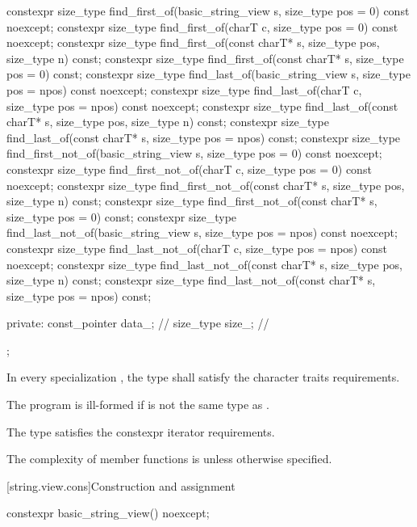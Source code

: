 \begin{codeblock}
{  constexpr size_type find_first_of(basic_string_view s, size_type pos = 0) const noexcept;
  constexpr size_type find_first_of(charT c, size_type pos = 0) const noexcept;
  constexpr size_type find_first_of(const charT* s, size_type pos, size_type n) const;
  constexpr size_type find_first_of(const charT* s, size_type pos = 0) const;
  constexpr size_type find_last_of(basic_string_view s, size_type pos = npos) const noexcept;
  constexpr size_type find_last_of(charT c, size_type pos = npos) const noexcept;
  constexpr size_type find_last_of(const charT* s, size_type pos, size_type n) const;
  constexpr size_type find_last_of(const charT* s, size_type pos = npos) const;
  constexpr size_type find_first_not_of(basic_string_view s, size_type pos = 0) const noexcept;
  constexpr size_type find_first_not_of(charT c, size_type pos = 0) const noexcept;
  constexpr size_type find_first_not_of(const charT* s, size_type pos,
                                        size_type n) const;
  constexpr size_type find_first_not_of(const charT* s, size_type pos = 0) const;
  constexpr size_type find_last_not_of(basic_string_view s,
                                       size_type pos = npos) const noexcept;
  constexpr size_type find_last_not_of(charT c, size_type pos = npos) const noexcept;
  constexpr size_type find_last_not_of(const charT* s, size_type pos,
                                       size_type n) const;
  constexpr size_type find_last_not_of(const charT* s, size_type pos = npos) const;

private:
  const_pointer data_; // \expos
  size_type size_;     // \expos
};
\end{codeblock}

\pnum
In every specialization , the type  shall satisfy the character traits requirements.
\begin{note}
The program is ill-formed if  is not the same type as .
\end{note}

\pnum
The type  satisfies
the constexpr iterator requirements.

\pnum
The complexity of  member functions is 
unless otherwise specified.

[string.view.cons]{Construction and assignment}

%
\begin{itemdecl}
constexpr basic_string_view() noexcept;
\end{itemdecl}

